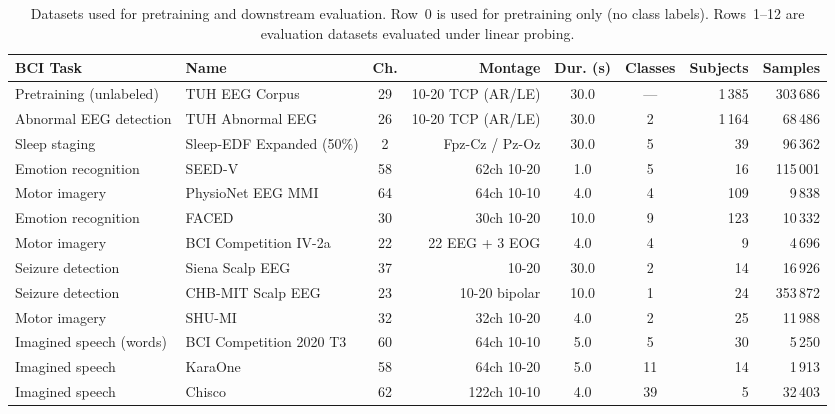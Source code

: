 \documentclass{article}
\begin{document}
\begin{table}[H]
  \centering
  \caption{
    Datasets used for pretraining and downstream evaluation.
    Row~0 is used for pretraining only (no class labels).
    Rows~1--12 are evaluation datasets evaluated under linear probing.
  }
  \label{tab:datasets}
  \small
  \begin{tabular}{llcrccrr}
    \toprule
    \textbf{BCI Task} & \textbf{Name} & \textbf{Ch.} & \textbf{Montage} & \textbf{Dur. (s)} & \textbf{Classes} & \textbf{Subjects} & \textbf{Samples} \\
    \midrule
    Pretraining (unlabeled) & TUH EEG Corpus          & 29 & 10-20 TCP (AR/LE)  & 30.0 & ---  & 1\,385 & 303\,686 \\
    \midrule
    Abnormal EEG detection  & TUH Abnormal EEG        & 26 & 10-20 TCP (AR/LE)  & 30.0 & 2    & 1\,164 &  68\,486 \\
    Sleep staging           & Sleep-EDF Expanded (50\%)     &  2 & Fpz-Cz / Pz-Oz     & 30.0 & 5    &     39 &  96\,362 \\
    Emotion recognition     & SEED-V                  & 58 & 62ch 10-20          &  1.0 & 5    &     16 & 115\,001 \\
    Motor imagery           & PhysioNet EEG MMI       & 64 & 64ch 10-10          &  4.0 & 4    &    109 &   9\,838 \\
    Emotion recognition     & FACED                   & 30 & 30ch 10-20          & 10.0 & 9    &    123 &  10\,332 \\
    Motor imagery           & BCI Competition IV-2a   & 22 & 22 EEG + 3 EOG      &  4.0 & 4    &      9 &   4\,696 \\
    Seizure detection       & Siena Scalp EEG         & 37 & 10-20               & 30.0 & 2    &     14 &  16\,926 \\
    Seizure detection       & CHB-MIT Scalp EEG       & 23 & 10-20 bipolar        & 10.0 & 1    &     24 & 353\,872 \\
    Motor imagery           & SHU-MI                  & 32 & 32ch 10-20          &  4.0 & 2    &     25 &  11\,988 \\
    Imagined speech (words) & BCI Competition 2020 T3 & 60 & 64ch 10-10          &  5.0 & 5    &     30 &   5\,250 \\
    Imagined speech         & KaraOne                 & 58 & 64ch 10-20          &  5.0 & 11   &     14 &   1\,913 \\
    Imagined speech         & Chisco                  & 62 & 122ch 10-10         &  4.0 & 39   &      5 &  32\,403 \\
    \bottomrule
  \end{tabular}
\end{table}
\end{document}
